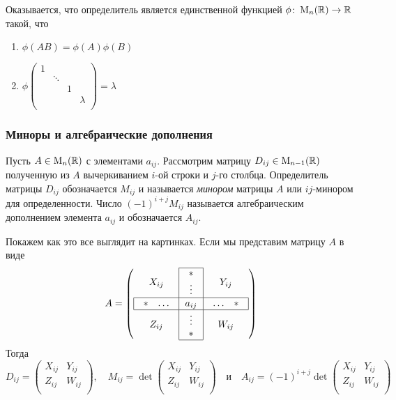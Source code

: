 \documentclass{article}
\begin{document}
Оказывается, что определитель является единственной функцией $\phi\colon \operatorname{M}_{n}(\mathbb R)\to \mathbb R$ такой, что
\begin{enumerate}
	\item $\phi(AB) = \phi(A) \phi(B)$
	\item 
	$
	\phi
	\begin{pmatrix}
		{1}&{}&{}&{}\\
		{}&{\ddots}&{}&{}\\
		{}&{}&{1}&{}\\
		{}&{}&{}&{\lambda}\\
	\end{pmatrix}
	=\lambda
	$
\end{enumerate}

\subsubsection*{Миноры и алгебраические дополнения}

Пусть $A\in \operatorname{M}_{n}(\mathbb R)$ с элементами $a_{ij}$. Рассмотрим матрицу $D_{ij}\in\operatorname{M}_{n-1}(\mathbb R)$ полученную из $A$ вычеркиванием $i$-ой строки и $j$-го столбца. Определитель матрицы $D_{ij}$ обозначается $M_{ij}$ и называется {\it минором} матрицы $A$ или $ij$-минором для определенности. Число $(-1)^{i+j} M_{ij}$ называется алгебраическим дополнением элемента $a_{ij}$ и обозначается $A_{ij}$.

Покажем как это все выглядит на картинках.  Если мы представим матрицу $A$ в виде
\[
A =
\left(
\begin{array}{c|c|c}
	\cline{2-2}
	{X_{ij}}&{
		\begin{array}{c}
			{*}\\{\vdots}
		\end{array}
	}&{Y_{ij}}\\
	\hline
	\multicolumn{1}{|c|}{
		\begin{array}{cc}
			{*}&{\ldots}
		\end{array}
	}&{a_{ij}}&\multicolumn{1}{c|}{
		\begin{array}{cc}
			{\ldots}&{*}
		\end{array}
	}\\
	\hline
	{Z_{ij}}&{
		\begin{array}{c}
			{\vdots}\\{*}
		\end{array}
	}&{W_{ij}}\\
	\cline{2-2}
\end{array}
\right)
\]
Тогда
\[
D_{ij} =
\begin{pmatrix}
	{X_{ij}}&{Y_{ij}}\\
	{Z_{ij}}&{W_{ij}}\\
\end{pmatrix},\quad
M_{ij} = 
\det
\begin{pmatrix}
	{X_{ij}}&{Y_{ij}}\\
	{Z_{ij}}&{W_{ij}}\\
\end{pmatrix}\quad\text{и}\quad
A_{ij} =
(-1)^{i+j}
\det
\begin{pmatrix}
	{X_{ij}}&{Y_{ij}}\\
	{Z_{ij}}&{W_{ij}}\\
\end{pmatrix}
\]
\end{document}
